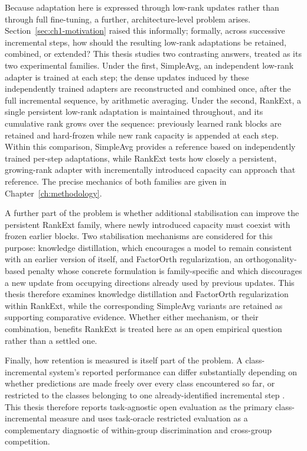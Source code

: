 Because adaptation here is expressed through low-rank updates rather than
through full fine-tuning, a further, architecture-level problem arises.
Section~\ref{sec:ch1-motivation} raised this informally; formally, across
successive incremental steps, how should the resulting low-rank
adaptations be retained, combined, or extended? This thesis studies two
contrasting answers, treated as its two experimental families. Under the
first, SimpleAvg, an independent low-rank adapter is trained at each step;
the dense updates induced by these independently trained adapters are
reconstructed and combined once, after the full incremental sequence, by
arithmetic averaging. Under the second, RankExt, a single persistent
low-rank adaptation is maintained throughout, and its cumulative rank grows
over the sequence: previously learned rank blocks are retained and
hard-frozen while new rank capacity is appended at each step. Within this
comparison, SimpleAvg provides a reference based on independently trained
per-step adaptations, while RankExt tests how closely a persistent,
growing-rank adapter with incrementally introduced capacity can approach
that reference. The precise mechanics of both families are given in
Chapter~\ref{ch:methodology}.

A further part of the problem is whether additional stabilisation can
improve the persistent RankExt family, where newly introduced capacity must
coexist with frozen earlier blocks. Two stabilisation mechanisms are
considered for this purpose: knowledge distillation, which encourages a
model to remain consistent with an earlier version of itself, and FactorOrth
regularization, an orthogonality-based penalty whose concrete formulation
is family-specific and which discourages a new update from occupying
directions already used by previous updates. This
thesis therefore examines knowledge distillation and FactorOrth
regularization within RankExt, while the corresponding SimpleAvg variants
are retained as supporting comparative evidence. Whether either mechanism,
or their combination, benefits RankExt is treated here as an open empirical
question rather than a settled one.

Finally, how retention is measured is itself part of the problem. A
class-incremental system's reported performance can differ substantially
depending on whether predictions are made freely over every class
encountered so far, or restricted to the classes belonging to one
already-identified incremental step \parencite{delange2022continual}.
This thesis therefore reports task-agnostic open evaluation as the primary
class-incremental measure and uses task-oracle restricted evaluation as a
complementary diagnostic of within-group discrimination and cross-group
competition.

